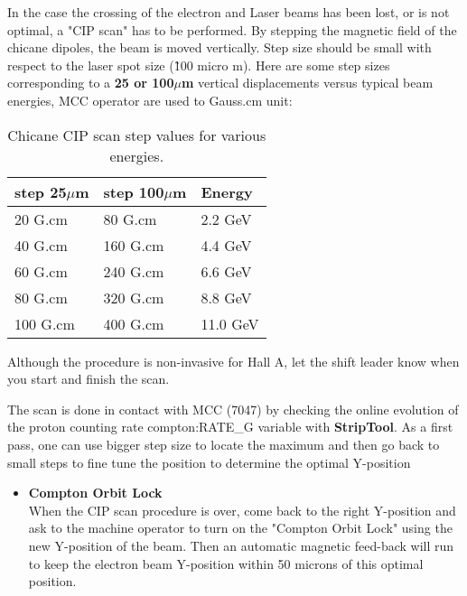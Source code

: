 {        In the case the crossing of the electron and Laser beams
        has been lost, or is not optimal, a "CIP scan" has to be performed.
        By stepping the magnetic field of the
        chicane dipoles, the beam is moved vertically. Step size should be
        small with respect to the laser spot size (\~100 micro m). Here are some
        step sizes corresponding to a {\bf 25 or 100$\mu$m  } vertical displacements versus
        typical beam energies, MCC operator are used to Gauss.cm unit:
\begin{table}[ht]
\begin{center}
\begin{tabular}{|l|l|l|} \hline
step 25$\mu$m & step 100$\mu$m & Energy \\ \hline\hline
20 G.cm & 80 G.cm & 2.2 GeV \\ \hline
40 G.cm &  160 G.cm &  4.4 GeV \\ \hline
60 G.cm &  240 G.cm & 6.6  GeV \\ \hline
80 G.cm &  320 G.cm &  8.8 GeV \\ \hline
100 G.cm &  400 G.cm &  11.0 GeV \\ \hline 
\end{tabular}
\end{center}
\caption[Compton:vertical scan]{Chicane CIP  scan step values for various energies.
}
\label{tab:compton_vscan}
\end{table}
	
Although the procedure is non-invasive for Hall A, let the shift leader know
when you start and finish the scan.

The scan is done in contact with MCC (7047) by checking the online evolution
        of the proton counting rate compton:RATE\_G variable with  {\bf StripTool}.
        As a first pass, one can use bigger step size to locate
        the maximum and then go back to small steps to fine tune the position to determine 
        the optimal Y-position

\begin{itemize}
\item {\bf Compton Orbit Lock}\\
When the CIP scan  procedure is over, come back to the right Y-position and
        ask to the machine operator to turn on the "Compton Orbit Lock"  using  the new Y-position of the beam. Then an
        automatic magnetic feed-back will run to keep the electron beam Y-position
        within 50 microns of this optimal position. 



\end{itemize}}
